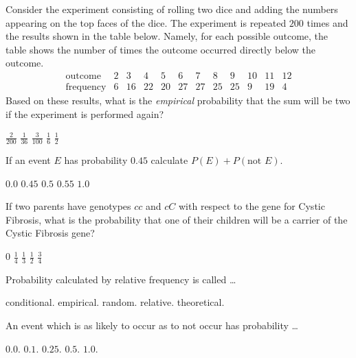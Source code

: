 \documentclass[answers,12pt]{exam}
\begin{document}
\begin{questions}
\newpage
\question Consider the experiment consisting
of rolling two dice and adding the numbers
appearing on the top faces of the dice.
The experiment is repeated $200$ times and the
results shown in the table below. Namely, 
for each possible outcome, the table shows the number
of times the outcome occurred directly below the outcome.
\[\begin{array}{r|ccccccccccc}
\text{outcome}&2&3&4&5&6&7&8&9&10&11&12\\\hline
\text{frequency}&6&16&22&20&27&27&25&25&9&19&4
\end{array}\]
Based on these results, what is the {\em empirical} probability
that the sum will be two if the experiment is performed again?\\
\begin{oneparchoices}
\choice $\frac{2}{200}$
\choice $\frac{1}{36}$
\choice $\frac{3}{100}$
\choice $\frac{1}{6}$
\choice $\frac{1}{2}$
\end{oneparchoices}

\question If an event $E$ has probability $0.45$
calculate $P\left(E\right)+P\left(\text{not $E$}\right)$.\\
\begin{oneparchoices}
\choice $0.0$
\choice $0.45$
\choice $0.5$
\choice $0.55$
\choice $1.0$
\end{oneparchoices}

\question If two parents have genotypes $cc$ and $cC$
with respect to the gene for Cystic Fibrosis, what
is the probability that one of their children will be
a carrier of the Cystic Fibrosis gene?\\
\begin{oneparchoices}
\choice $0$
\choice $\frac{1}{4}$
\choice $\frac{1}{3}$
\choice $\frac{1}{2}$
\choice $\frac{3}{4}$
\end{oneparchoices}

\question Probability calculated by relative frequency is called \dots\\
\begin{oneparchoices}
\choice conditional.
\choice empirical.
\choice random.
\choice relative.
\choice theoretical.
\end{oneparchoices}

\question An event which is as likely to occur as to not occur has probability \dots\\
\begin{oneparchoices}
\choice $0.0$.
\choice $0.1$.
\choice $0.25$.
\choice $0.5$.
\choice $1.0$.
\end{oneparchoices}

\end{questions}
\end{document}
